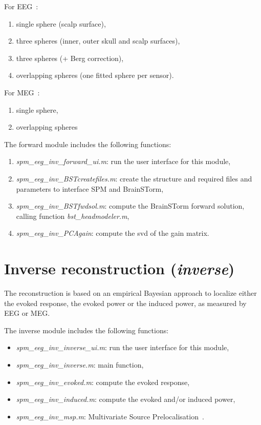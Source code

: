 For EEG~\cite{Ermer2001}:
\begin{enumerate}
    \item single sphere (scalp surface),
    \item three spheres (inner, outer skull and scalp surfaces),
    \item three spheres (+ Berg correction),
    \item overlapping spheres (one fitted sphere per sensor).
\end{enumerate}

For MEG~\cite{Huang1999}:
\begin{enumerate}
    \item single sphere,
    \item overlapping spheres
\end{enumerate}


The forward module includes the following functions:
\begin{enumerate}
    \item \textit{spm\_eeg\_inv\_forward\_ui.m}: run the user interface for this module,
    \item \textit{spm\_eeg\_inv\_BSTcreatefiles.m}: create the structure and required files and parameters to interface SPM and BrainSTorm,
    \item \textit{spm\_eeg\_inv\_BSTfwdsol.m}:  compute the BrainSTorm forward solution, calling function \textit{bst\_headmodeler.m},
    \item \textit{spm\_eeg\_inv\_PCAgain}: compute the svd of the gain matrix.
\end{enumerate}


\section{Inverse reconstruction (\textit{inverse})}
The reconstruction is based on an empirical Bayesian approach to localize either the evoked response, the evoked power or the induced power, as measured by EEG or MEG.

The inverse module includes the following functions:
\begin{itemize}
    \item \textit{spm\_eeg\_inv\_inverse\_ui.m}: run the user interface for this module,
    \item \textit{spm\_eeg\_inv\_inverse.m}: main function,
    \item \textit{spm\_eeg\_inv\_evoked.m}: compute the evoked response,
    \item \textit{spm\_eeg\_inv\_induced.m}:    compute the evoked and/or induced power,
    \item \textit{spm\_eeg\_inv\_msp.m}: Multivariate Source Prelocalisation~\cite{Mattout2005a}.
\end{itemize}
    
